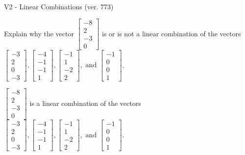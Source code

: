 \begin{exercise}
  \begin{exerciseTitle}V2 - Linear Combinations (ver. 773)\end{exerciseTitle}
  \begin{exerciseStatement}
    Explain why the vector \(\left[\begin{array}{c}
-8 \\
2 \\
-3 \\
0
\end{array}\right]\)  is or is not a linear 
	combination of the vectors \(\left[\begin{array}{c}
-3 \\
2 \\
0 \\
-3
\end{array}\right] , \left[\begin{array}{c}
-4 \\
-1 \\
-1 \\
1
\end{array}\right] , \left[\begin{array}{c}
-1 \\
1 \\
-2 \\
2
\end{array}\right] , \text{ and } \left[\begin{array}{c}
-1 \\
0 \\
0 \\
1
\end{array}\right]\).
	


  \end{exerciseStatement}
  \begin{exerciseAnswer}
   \(\left[\begin{array}{c}
-8 \\
2 \\
-3 \\
0
\end{array}\right]\) 
  	 is  
	a linear combination of the vectors \(\left[\begin{array}{c}
-3 \\
2 \\
0 \\
-3
\end{array}\right] , \left[\begin{array}{c}
-4 \\
-1 \\
-1 \\
1
\end{array}\right] , \left[\begin{array}{c}
-1 \\
1 \\
-2 \\
2
\end{array}\right] , \text{ and } \left[\begin{array}{c}
-1 \\
0 \\
0 \\
1
\end{array}\right]\).


\end{exerciseAnswer}
\end{exercise}
